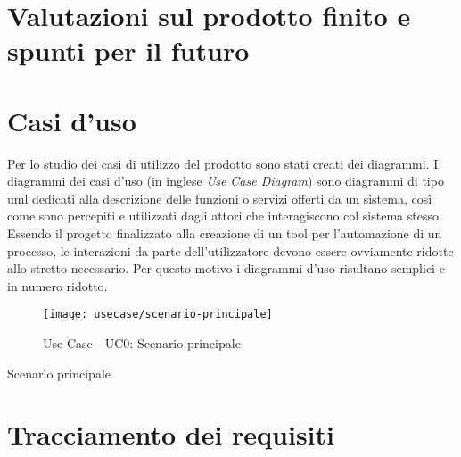 \section{Valutazioni sul prodotto finito e spunti per il futuro}

\section{Casi d'uso}

Per lo studio dei casi di utilizzo del prodotto sono stati creati dei diagrammi.
I diagrammi dei casi d'uso (in inglese \emph{Use Case Diagram}) sono diagrammi di tipo \gls{uml} dedicati alla descrizione delle funzioni o servizi offerti da un sistema, così come sono percepiti e utilizzati dagli attori che interagiscono col sistema stesso.
Essendo il progetto finalizzato alla creazione di un tool per l'automazione di un processo, le interazioni da parte dell'utilizzatore devono essere ovviamente ridotte allo stretto necessario. Per questo motivo i diagrammi d'uso risultano semplici e in numero ridotto.

\begin{figure}[!h] 
    \centering 
    \texttt{[image: usecase/scenario-principale]} 
    \caption{Use Case - UC0: Scenario principale}
\end{figure}

\begin{usecase}{0}{Scenario principale}
\label{uc:scenario-principale}
\end{usecase}

\section{Tracciamento dei requisiti}

